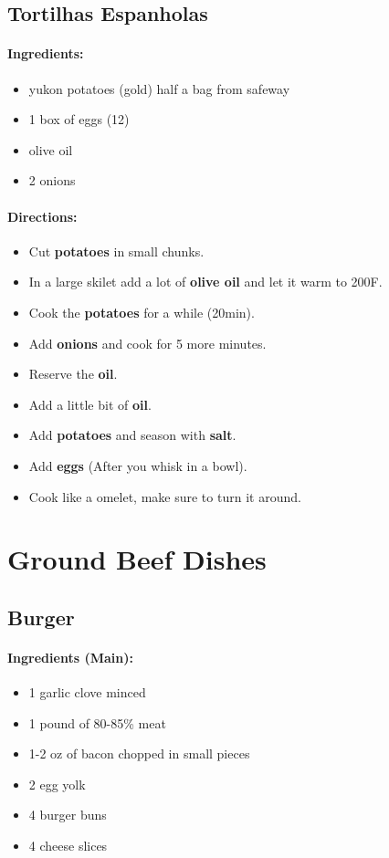 \documentclass{article}
\begin{document}
\subsection{Tortilhas Espanholas}

\paragraph{Ingredients:}
\begin{itemize}
    \item yukon potatoes (gold) half a bag from safeway
    \item 1 box of eggs (12)
    \item olive oil
    \item 2 onions
\end{itemize}

\paragraph{Directions:}
\begin{itemize}
    \item Cut \textbf{potatoes} in small chunks.
    \item In a large skilet add a lot of \textbf{olive oil} and let it warm to 200F.
    \item Cook the \textbf{potatoes} for a while (20min).
    \item Add \textbf{onions} and cook for 5 more minutes.
    \item Reserve the \textbf{oil}.
    \item Add a little bit of \textbf{oil}.
    \item Add \textbf{potatoes} and season with \textbf{salt}.
    \item Add \textbf{eggs} (After you whisk in a bowl).
    \item Cook like a omelet, make sure to turn it around.
\end{itemize}

\section{Ground Beef Dishes}


\subsection{Burger} 

\paragraph{Ingredients (Main):}
\begin{itemize}
    \item 1 garlic clove minced
    \item 1 pound of 80-85\% meat
    \item 1-2 oz of bacon chopped in small pieces
    \item 2 egg yolk
    \item 4 burger buns
    \item 4 cheese slices
\end{itemize}  
\end{document}
